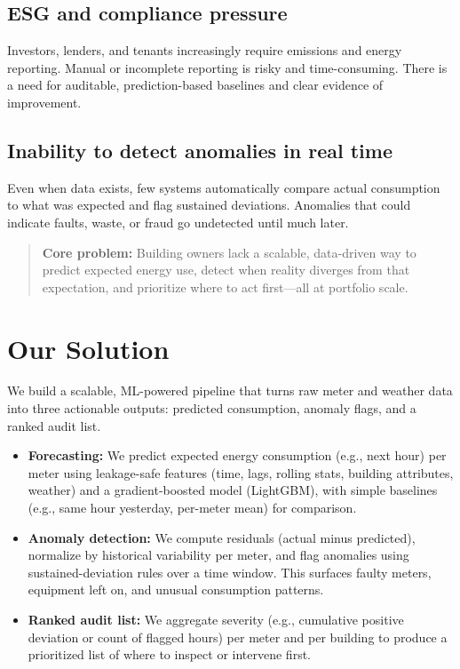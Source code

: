 \documentclass[11pt,a4paper]{article}
\begin{document}
\subsection{ESG and compliance pressure}
Investors, lenders, and tenants increasingly require emissions and energy reporting. Manual or incomplete reporting is risky and time-consuming. There is a need for auditable, prediction-based baselines and clear evidence of improvement.

\subsection{Inability to detect anomalies in real time}
Even when data exists, few systems automatically compare actual consumption to what was expected and flag sustained deviations. Anomalies that could indicate faults, waste, or fraud go undetected until much later.

\begin{quote}
\noindent\textbf{Core problem:} Building owners lack a scalable, data-driven way to predict expected energy use, detect when reality diverges from that expectation, and prioritize where to act first---all at portfolio scale.
\end{quote}

\section{Our Solution}

We build a scalable, ML-powered pipeline that turns raw meter and weather data into three actionable outputs: predicted consumption, anomaly flags, and a ranked audit list.

\begin{itemize}[noitemsep]
  \item \textbf{Forecasting:} We predict expected energy consumption (e.g., next hour) per meter using leakage-safe features (time, lags, rolling stats, building attributes, weather) and a gradient-boosted model (LightGBM), with simple baselines (e.g., same hour yesterday, per-meter mean) for comparison.
  \item \textbf{Anomaly detection:} We compute residuals (actual minus predicted), normalize by historical variability per meter, and flag anomalies using sustained-deviation rules over a time window. This surfaces faulty meters, equipment left on, and unusual consumption patterns.
  \item \textbf{Ranked audit list:} We aggregate severity (e.g., cumulative positive deviation or count of flagged hours) per meter and per building to produce a prioritized list of where to inspect or intervene first.
\end{itemize}
\end{document}
